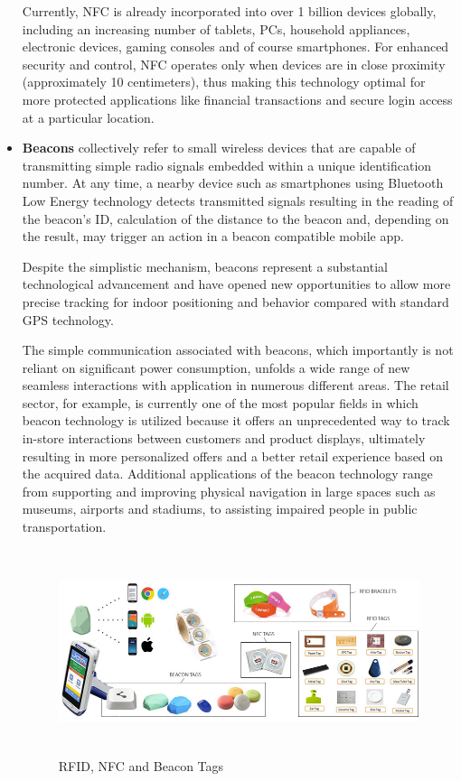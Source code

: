 \begin{itemize}
  Currently, NFC is already incorporated into over 1 billion devices globally, including an increasing number of tablets, PCs, household appliances, electronic devices, gaming consoles and of course smartphones. For enhanced security and control, NFC operates only when devices are in close proximity (approximately 10 centimeters), thus making this technology optimal for more protected applications like financial transactions and secure login access at a particular location. 
 
  \item \textbf{Beacons} collectively refer to small wireless devices that are capable of transmitting simple radio signals embedded within a unique identification number. At any time, a nearby device such as smartphones using Bluetooth Low Energy technology detects transmitted signals resulting in the reading of the beacon's ID, calculation of the distance to the beacon and, depending on the result, may trigger an action in a beacon compatible mobile app. 
  
  Despite the simplistic mechanism, beacons represent a substantial technological advancement and have opened new opportunities to allow more precise tracking for indoor positioning and behavior compared with standard GPS technology.
  
  The simple communication associated with beacons, which importantly is not reliant on significant power consumption, unfolds a wide range of new seamless interactions with application in numerous different areas. The retail sector, for example, is currently one of the most popular fields in which beacon technology is utilized because it offers an unprecedented way to track in-store interactions between customers and product displays, ultimately resulting in more personalized offers and a better retail experience based on the acquired data. Additional applications of the beacon technology range from supporting and improving physical navigation in large spaces such as museums, airports and stadiums, to assisting impaired people in public transportation.

  \vspace{0.5cm}
  \begin{figure}[htbp]
    \centering
      \includegraphics[height=6cm]{images/iot-devices.jpg}
    \caption{RFID, NFC and Beacon Tags}
    \label{fig:devices}
  \end{figure}
  \vspace{0.5cm}


\end{itemize}
